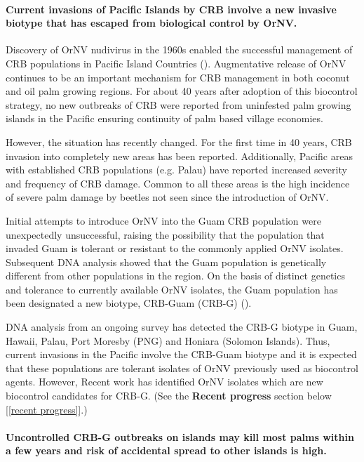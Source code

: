 \documentclass[12pt,letterpaper,english,bibliography=totocnumbered, abstract=on]{scrartcl}
\begin{document}
\paragraph*{Current invasions of Pacific Islands by CRB involve a new invasive
biotype that has escaped from biological control by OrNV. }

Discovery of OrNV nudivirus in the 1960s enabled the successful management
of CRB populations in Pacific Island Countries (\cite{huger_oryctes_2005-1}).
Augmentative release of OrNV continues to be an important mechanism
for CRB management in both coconut and oil palm growing regions. For
about 40 years after adoption of this biocontrol strategy,
no new outbreaks of CRB were reported from uninfested palm growing
islands in the Pacific ensuring continuity of palm based village economies. 

However, the situation has recently changed. For the first time in
40 years, CRB invasion into completely new areas has been reported.
Additionally, Pacific areas with established CRB populations (e.g.
Palau) have reported increased severity and frequency of CRB damage.
Common to all these areas is the high incidence of severe palm damage
by beetles not seen since the introduction of OrNV. 

Initial attempts to introduce OrNV into the Guam CRB population were
unexpectedly unsuccessful, raising the possibility that the population
that invaded Guam is tolerant or resistant to the commonly applied
OrNV isolates. Subsequent DNA analysis showed that the Guam population
is genetically different from other populations in the region. On
the basis of distinct genetics and tolerance to currently available
OrNV isolates, the Guam population has been designated a new biotype,
CRB-Guam (CRB-G) (\cite{marshall_new_2015,marshall_new_2017-1}).

DNA analysis from an ongoing survey has detected the CRB-G biotype
in Guam, Hawaii, Palau, Port Moresby (PNG) and Honiara (Solomon Islands).
Thus, current invasions in the Pacific involve the CRB-Guam biotype
and it is expected that these populations are tolerant
isolates of OrNV previously used as biocontrol agents. However, Recent work has identified OrNV isolates which are new biocontrol candidates for CRB-G. (See the \textbf{Recent progress} section below [\ref{recent progress}].)

\paragraph*{Uncontrolled CRB-G outbreaks on islands may kill most palms within a few
years and risk of accidental spread to other islands is high.}
\end{document}
